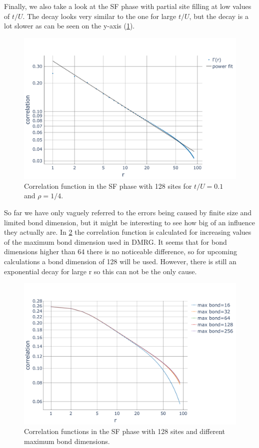 \documentclass[twoside,twocolumn,9pt]{article}
\begin{document}
Finally, we also take a look at the SF phase with partial site filling at low values of $t/U$. The decay looks very similar to the one for large $t/U$, but the decay is a lot slower as can be seen on the y-axis (\cref{fig:corSF2}). 
\begin{center}
  \begin{figure}
      \includegraphics[width=\linewidth]{../code/figures/Correlations-SF2.pdf}
      \caption{Correlation function in the SF phase with 128 sites for $t/U=0.1$ and $\rho=1/4$.}
      \label{fig:corSF2}
  \end{figure}
\end{center}
So far we have only vaguely referred to the errors being caused by finite size and limited bond dimension, but it might be interesting to see how big of an influence they actually are. 
In \cref{fig:bonds} the correlation function is calculated for increasing values of the maximum bond dimension used in DMRG. It seems that for bond dimensions higher than 64 there is no noticeable difference, so for upcoming calculations a bond dimension of 128 will be used. However, there is still an exponential decay for large r so this can not be the only cause.
\begin{center}
  \begin{figure}
      \includegraphics[width=\linewidth]{../code/figures/Correlations-bonds.pdf}
      \caption{Correlation functions in the SF phase with 128 sites and different maximum bond dimensions.}
      \label{fig:bonds}
  \end{figure}
\end{center}
\end{document}
